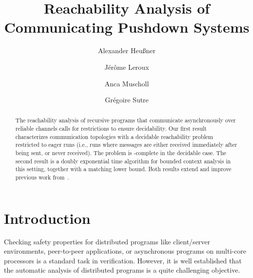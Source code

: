 \documentclass{LMCS}
\begin{document}
\title[Reachability Analysis of Communicating Pushdown Systems]{Reachability Analysis of Communicating Pushdown Systems\rsuper*}

\author[A.~Heußner]{Alexander Heußner}	\address{LaBRI, Universit{\'e} de Bordeaux, CNRS -- France}	  

\author[J.~Leroux]{Jérôme Leroux}	

\author[A.~Muscholl]{Anca Muscholl}	

\author[G.~Sutre]{Grégoire Sutre}	












\begin{abstract}
  \noindent The reachability analysis of recursive programs that
  communicate asynchro\-nously over reliable \fifo channels calls for
  restrictions to ensure decidability. Our first result characterizes
  communication topologies with a decidable reachability problem
  restricted to eager runs (i.e., runs where messages are either received
  immediately after being sent, or never received). 
 The problem is
  \dexptime-complete in the decidable case.  The second result is a
  doubly exponential time algorithm for bounded context analysis in
  this setting, together with a matching lower bound. Both results
  extend and improve previous work from~\cite{latorre-s-2008-299-a}.
\end{abstract}
 
\maketitle


\section*{Introduction}

Checking safety properties for distributed programs like client/server
environments, peer-to-peer applications, or asynchronous programs on
multi-core processors is a standard task in
verification. However, it is well established that the automatic
analysis of distributed programs is a quite challenging
objective. 
\end{document}
